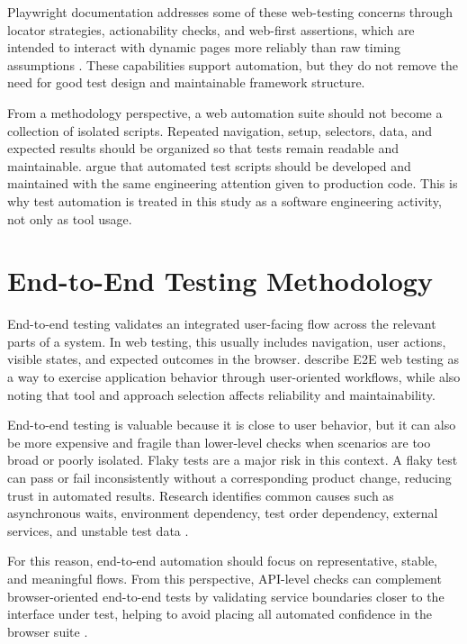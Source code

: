 Playwright documentation addresses some of these web-testing concerns through locator strategies, actionability checks, and web-first assertions, which are intended to interact with dynamic pages more reliably than raw timing assumptions \autocite{playwright_docs_locators_2026,playwright_docs_actionability_2026,playwright_docs_assertions_2026}. These capabilities support automation, but they do not remove the need for good test design and maintainable framework structure.

From a methodology perspective, a web automation suite should not become a collection of isolated scripts. Repeated navigation, setup, selectors, data, and expected results should be organized so that tests remain readable and maintainable. \textcite{garousi_felderer_test_scripts_2016} argue that automated test scripts should be developed and maintained with the same engineering attention given to production code. This is why test automation is treated in this study as a software engineering activity, not only as tool usage.

\section{End-to-End Testing Methodology}
\label{sec:ch2-e2e-methodology}

End-to-end testing validates an integrated user-facing flow across the relevant parts of a system. In web testing, this usually includes navigation, user actions, visible states, and expected outcomes in the browser. \textcite{leotta_e2e_web_testing_2016} describe E2E web testing as a way to exercise application behavior through user-oriented workflows, while also noting that tool and approach selection affects reliability and maintainability.

End-to-end testing is valuable because it is close to user behavior, but it can also be more expensive and fragile than lower-level checks when scenarios are too broad or poorly isolated. Flaky tests are a major risk in this context. A flaky test can pass or fail inconsistently without a corresponding product change, reducing trust in automated results. Research identifies common causes such as asynchronous waits, environment dependency, test order dependency, external services, and unstable test data \autocite{habchi_flaky_tests_2022,tahir_flakiness_review_2023}.

For this reason, end-to-end automation should focus on representative, stable, and meaningful flows. From this perspective, API-level checks can complement browser-oriented end-to-end tests by validating service boundaries closer to the interface under test, helping to avoid placing all automated confidence in the browser suite \autocite{leotta_e2e_web_testing_2016,istqb_ctfl_syllabus_2024}.

